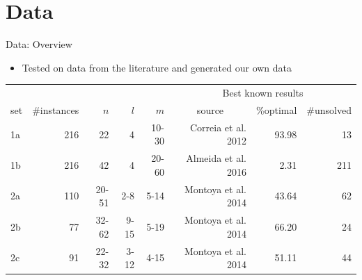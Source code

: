 \documentclass{beamer}
\begin{document}
\section{Data}
\begin{frame}{Data: Overview}
	\begin{itemize}
		\item Tested on data from the literature and generated our own data\pause
	\end{itemize}
\begin{table}[tpb]
	\begin{adjustwidth}{-0.5cm}{}
    \setlength{\tabcolsep}{3pt}
    \centering
    \small
	\begin{tabular}{@{}lrrrrrrr@{}}
		\toprule
		&  &  &  &  & \multicolumn{3}{c}{Best known results}\\ 
        \cmidrule(l){6-8} 
		set & \multicolumn{1}{l}{\#instances} & $n$ & $l$ & $m$ & \multicolumn{1}{c}{source} & \multicolumn{1}{r}{\%optimal} & {\color{red} \#unsolved} \\ \midrule
		1a     & 216 & 22 & 4 & 10-30 & Correia et al. 2012 & 93.98 & {\color{red} 13}\\
		1b     & 216& 42 & 4 & 20-60 & Almeida et al. 2016 & 2.31 & {\color{red} 211} \\ \midrule
		2a     & 110 & 20-51 & 2-8 & 5-14 & Montoya et al. 2014 & 43.64 & {\color{red} 62} \\
		2b     & 77 & 32-62 & 9-15 & 5-19 & Montoya et al. 2014 & 66.20 & {\color{red} 24} \\
		2c     & 91 & 22-32 & 3-12 & 4-15 & Montoya et al. 2014 & 51.11 & {\color{red} 44} \\ \bottomrule
	\end{tabular}
    \end{adjustwidth}
	\label{tab:data}
\end{table}

\end{frame}
\end{document}
